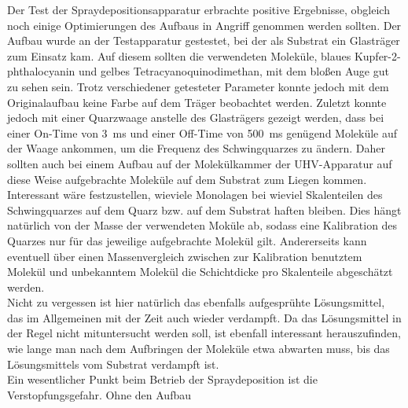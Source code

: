 
Der Test der Spraydepositionsapparatur erbrachte positive Ergebnisse, obgleich noch einige
Optimierungen des Aufbaus in Angriff genommen werden sollten. Der Aufbau wurde an der Testapparatur
gestestet, bei der als Substrat ein Glasträger zum Einsatz kam. Auf diesem sollten die verwendeten
Moleküle, blaues Kupfer-2-phthalocyanin und gelbes Tetracyanoquinodimethan, mit dem bloßen Auge gut
zu sehen sein. Trotz verschiedener getesteter Parameter konnte jedoch mit dem Originalaufbau keine
Farbe auf dem Träger beobachtet werden.
Zuletzt konnte jedoch mit einer Quarzwaage anstelle des
Glasträgers gezeigt werden, dass bei einer On-Time von \SI{3}{ms} und einer Off-Time von
\SI{500}{ms} genügend Moleküle auf der Waage ankommen, um die Frequenz des Schwingquarzes zu
ändern. Daher sollten auch bei einem Aufbau auf der Molekülkammer der UHV-Apparatur auf diese Weise
aufgebrachte Moleküle auf dem Substrat zum Liegen kommen. Interessant wäre festzustellen, wieviele
Monolagen bei wieviel Skalenteilen des Schwingquarzes auf dem Quarz bzw. auf dem Substrat haften
bleiben. Dies hängt natürlich von der Masse der verwendeten Moküle ab, sodass eine Kalibration des
Quarzes nur für das jeweilige aufgebrachte Molekül gilt. Andererseits kann eventuell über einen
Massenvergleich zwischen zur Kalibration benutztem Molekül und unbekanntem Molekül die Schichtdicke
pro Skalenteile abgeschätzt werden.
\\
Nicht zu vergessen ist hier natürlich das ebenfalls aufgesprühte Lösungsmittel, das im
Allgemeinen mit der Zeit auch wieder verdampft. Da das Lösungsmittel in der Regel nicht
mituntersucht werden soll, ist ebenfall interessant herauszufinden, wie lange man nach dem
Aufbringen der Moleküle etwa abwarten muss, bis das Lösungsmittels vom Substrat
verdampft ist.
\\
Ein wesentlicher Punkt beim Betrieb der Spraydeposition ist die Verstopfungsgefahr. Ohne den Aufbau
